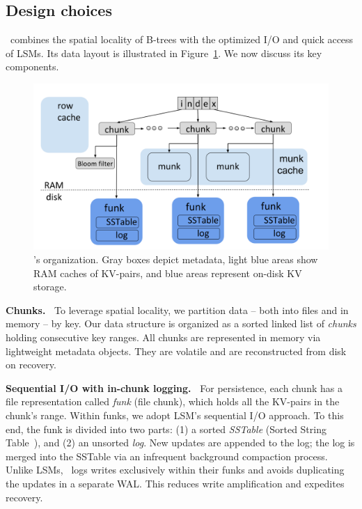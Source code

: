 \subsection{Design choices}

\sys\ combines the spatial locality of B-trees with the optimized I/O and quick access of LSMs. 
Its data layout is illustrated in Figure~\ref{fig:piwi}.  We now discuss its key components.   

\begin{figure}[tb]
\includegraphics[width=\columnwidth]{PiWi.png}
\caption{\sys's  organization. Gray boxes depict metadata, light blue areas show RAM caches of KV-pairs, and blue areas represent on-disk KV storage.}
\label{fig:piwi}
\end{figure}


{\bf Chunks.\ }
To leverage spatial locality, we partition data -- both into files and in memory -- by key.
Our  data structure is organized as a sorted linked list of \emph{chunks} holding consecutive key ranges.
All chunks are represented in memory via lightweight metadata objects. They are volatile and are reconstructed from disk on recovery.

{\bf Sequential I/O with in-chunk logging.\ }
For persistence, each chunk has a file representation called  \emph{funk} (file chunk), which holds all the KV-pairs in the chunk's range.
Within funks, we adopt LSM's sequential I/O approach. To this end, the funk 
is divided into two parts: (1) a sorted \emph{SSTable} (Sorted String Table~\cite{Bigtable2008}), and (2) an unsorted \emph{log}. 
New updates are appended to the log; the log is  merged into the SSTable via an infrequent background compaction process. 
Unlike LSMs, \sys\ logs writes exclusively within their funks and avoids duplicating the updates  in a separate WAL. This reduces write amplification and expedites recovery. 

